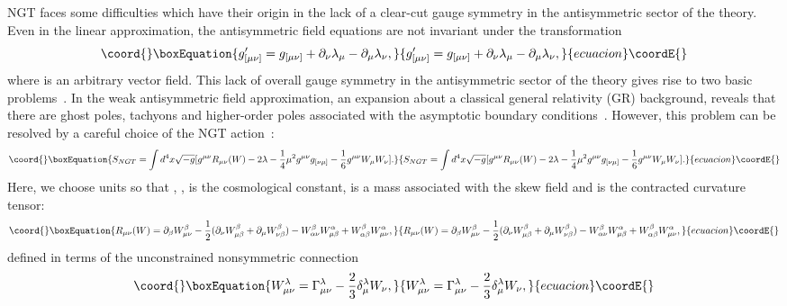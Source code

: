 \documentclass[a4paper,10pt]{article}
\begin{document}
NGT faces some difficulties which have their origin in the lack of a clear-cut gauge
symmetry in the antisymmetric sector of the theory. Even in the linear
approximation, the antisymmetric field equations are not invariant under
the transformation
\begin{equation}\coord{}\boxEquation{
g^\prime_{[\mu\nu]}=
g_{[\mu\nu]}+\partial_\nu\lambda_\mu-\partial_\mu\lambda_\nu,
}{
g^\prime_{[\mu\nu]}=
g_{[\mu\nu]}+\partial_\nu\lambda_\mu-\partial_\mu\lambda_\nu,
}{ecuacion}\coordE{}\end{equation}
where \myHighlight{$\lambda_\mu$}\coordHE{} is an arbitrary vector field. This lack of
overall gauge symmetry in the antisymmetric sector of the theory
gives rise to two basic problems~\cite{Damour,Clayton,Clayton2}.
In the weak antisymmetric field approximation, an expansion about
a classical general relativity (GR) background, reveals that
there are ghost poles, tachyons and higher-order poles associated
with the asymptotic boundary conditions~\cite{Damour}. However,
this problem can be resolved by a careful choice of the NGT
action~\cite{Moffat8,Moffat9}: \begin{equation}\coord{}\boxEquation{
\label{NGTaction}
S_{NGT}=\int
d^4x\sqrt{-g}[g^{\mu\nu}R_{\mu\nu}(W)-2\lambda-\frac{1}{4}\mu^2g^{\mu\nu}g_{[\nu\mu]}
-\frac{1}{6}g^{\mu\nu}W_\mu W_\nu].
}{
S_{NGT}=\int
d^4x\sqrt{-g}[g^{\mu\nu}R_{\mu\nu}(W)-2\lambda-\frac{1}{4}\mu^2g^{\mu\nu}g_{[\nu\mu]}
-\frac{1}{6}g^{\mu\nu}W_\mu W_\nu].
}{ecuacion}\coordE{}\end{equation}
Here, we choose units so that \coordHE{}, \coordHE{}, \myHighlight{$\lambda$}\coordHE{}
is the cosmological constant, \myHighlight{$\mu$}\coordHE{} is a mass associated with the
skew field \coordHE{} and \coordHE{} is the contracted curvature
tensor:
\begin{equation}\coord{}\boxEquation{
R_{\mu\nu}(W)=\partial_\beta
W^\beta_{\mu\nu}-\frac{1}{2}(\partial_\nu W^\beta_{\mu\beta}+\partial_\mu
W^\beta_{\nu\beta})-W^\beta_{\alpha\nu}W^\alpha_{\mu\beta}
+W^\beta_{\alpha\beta}W^\alpha_{\mu\nu},
}{
R_{\mu\nu}(W)=\partial_\beta
W^\beta_{\mu\nu}-\frac{1}{2}(\partial_\nu W^\beta_{\mu\beta}+\partial_\mu
W^\beta_{\nu\beta})-W^\beta_{\alpha\nu}W^\alpha_{\mu\beta}
+W^\beta_{\alpha\beta}W^\alpha_{\mu\nu},
}{ecuacion}\coordE{}\end{equation}
defined in terms of the unconstrained nonsymmetric connection
\begin{equation}\coord{}\boxEquation{
\label{Wconnection}
W^\lambda_{\mu\nu}=\Gamma^\lambda_{\mu\nu}-\frac{2}{3}\delta^\lambda_\mu
W_\nu, }{
W^\lambda_{\mu\nu}=\Gamma^\lambda_{\mu\nu}-\frac{2}{3}\delta^\lambda_\mu
W_\nu, }{ecuacion}\coordE{}\end{equation}
\end{document}
